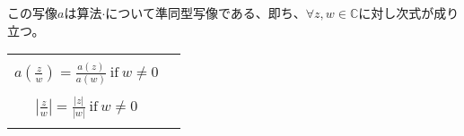 \documentclass[dvipdfmx]{jsarticle}
\begin{document}
\begin{thm}\label{4.1.2.12}
この写像$a$は算法$\cdot$について準同型写像である、即ち、$\forall z,w \in \mathbb{C}$に対し次式が成り立つ。
\begin{longtable}[c]{cc}
\hspace{-0.5em}\begin{tabular}{c}
$a(zw) = a(z)a(w)$\\
$a\left( \frac{z}{w} \right) = \frac{a(z)}{a(w)}\ \mathrm{if}\ w \neq 0$\\
\end{tabular} & \begin{tabular}{c}
$|zw| = |z||w|$\\
$\left| \frac{z}{w} \right| = \frac{|z|}{|w|}\ \mathrm{if}\ w \neq 0$\\
\end{tabular} \\
\end{longtable}
\end{thm}
\end{document}

